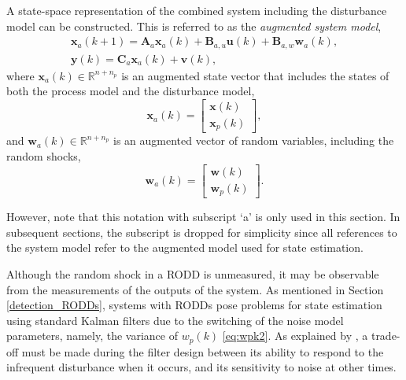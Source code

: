 {A state-space representation of the combined system including the disturbance model can be constructed. This is referred to as the \textit{augmented system model},
\begin{equation} \label{eq:ss_rep_xa}
	\begin{aligned}
		\mathbf{x}_a(k+1) = \mathbf{A}_a \mathbf{x}_a(k) + \mathbf{B}_{a,u} \mathbf{u}(k) + \mathbf{B}_{a,w} \mathbf{w}_{a}(k), \\
		\mathbf{y}(k) = \mathbf{C}_a \mathbf{x}_a(k) + \mathbf{v}(k),
	\end{aligned}
\end{equation}
where $\mathbf{x}_a(k) \in \mathbb{R}^{n+n_p}$ is an augmented state vector that includes the states of both the process model and the disturbance model, 
\begin{equation} \label{eq:xak}
	\mathbf{x}_a(k) = \begin{bmatrix}
		\mathbf{x}(k) \\
		\mathbf{x}_p(k)
	\end{bmatrix},
\end{equation}
and $\mathbf{w}_a(k) \in \mathbb{R}^{n+n_p}$ is an augmented vector of random variables, including the random shocks,
\begin{equation} \label{eq:wak}
	\mathbf{w}_a(k) = \begin{bmatrix}
		\mathbf{w}(k) \\
		\mathbf{w}_p(k)
	\end{bmatrix}.
\end{equation}

However, note that this notation with subscript `a' is only used in this section. In subsequent sections, the subscript is dropped for simplicity since all references to the system model refer to the augmented model used for state estimation.

Although the random shock in a \gls{RODD} is unmeasured, it may be observable from the measurements of the outputs of the system. As mentioned in Section \ref{detection_RODDs}, systems with \gls{RODD}s pose problems for state estimation using standard Kalman filters due to the switching of the noise model parameters, namely, the variance of $w_p(k)$ \eqref{eq:wpk2}. As explained by \cite{andersson_adaptive_1985}, a trade-off must be made during the filter design between its ability to respond to the infrequent disturbance when it occurs, and its sensitivity to noise at other times.


}
